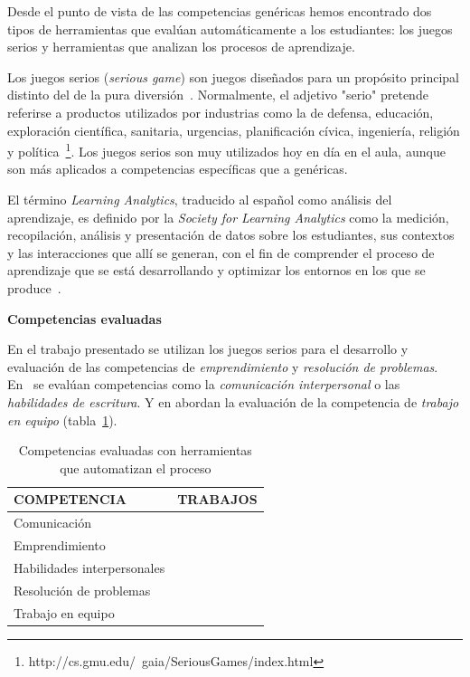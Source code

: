 Desde el punto de vista de las competencias genéricas hemos encontrado dos tipos de herramientas que evalúan automáticamente a los estudiantes: los juegos serios y herramientas que analizan los procesos de aprendizaje. 

Los juegos serios (\emph{serious game}) son juegos diseñados para un propósito principal distinto del de la pura diversión~\cite{djaouti2011classifying}. Normalmente, el adjetivo "serio" pretende referirse a productos utilizados por industrias como la de defensa, educación, exploración científica, sanitaria, urgencias, planificación cívica, ingeniería, religión y política~\footnote{http://cs.gmu.edu/~gaia/SeriousGames/index.html}. Los juegos serios son muy utilizados hoy en día en el aula, aunque son más aplicados a competencias específicas que a genéricas. 

El término \emph{Learning Analytics}, traducido al español como análisis del aprendizaje, es definido por la \emph{Society for Learning Analytics} como la medición, recopilación, análisis y presentación de datos sobre los estudiantes, sus contextos y las interacciones que allí se generan, con el fin de comprender el proceso de aprendizaje que se está desarrollando y optimizar los entornos en los que se produce~\cite{siemens2012learning}.

\bigskip
\textbf{Competencias evaluadas}
\bigskip

En el trabajo presentado \cite{guenaga2013serious} se utilizan los juegos serios para el desarrollo y evaluación de las competencias de \emph{emprendimiento} y \emph{resolución de problemas}. En~\cite{rayon2014web} se evalúan competencias como la \emph{comunicación interpersonal} o las \emph{habilidades de escritura}. Y en \cite{fidalgo:2015} abordan la evaluación de la competencia de \emph{trabajo en equipo} (tabla~\ref{tab:CompetenciasAutomaticas}).

\begin{table}
  \begin{center}
  \begin{tabular}{| m{3.5cm} | l |}
    \hline
    COMPETENCIA & TRABAJOS\\
    \hline
    \hline
    Comunicación & \cite{rayon2014web} \\
    \hline
    Emprendimiento & \cite{guenaga2013serious} \\	
    \hline
    Habilidades interpersonales & \cite{rayon2014web} \\
    \hline
    Resolución de problemas & \cite{guenaga2013serious} \\
    \hline
    Trabajo en equipo & \cite{fidalgo:2015} \\	  
    \hline
  \end{tabular}
\end{center}
\caption{Competencias evaluadas con herramientas que automatizan el proceso}
\label{tab:CompetenciasAutomaticas}
\end{table} 

